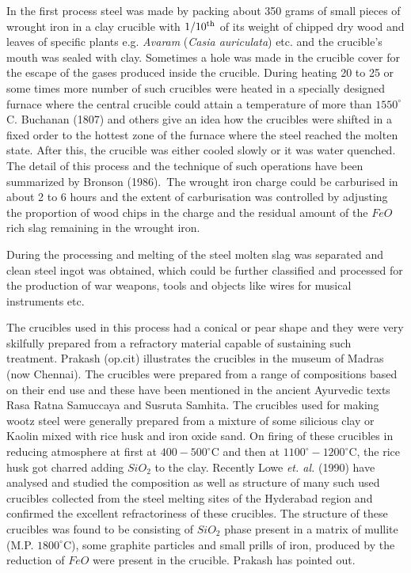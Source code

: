 In the first process steel was made by packing about 350 grams of small pieces of wrought iron in a clay crucible with $1/10^{\rm th}$ of its weight of chipped dry wood and leaves of specific plants e.g. {\it Avaram} ({\it Casia auriculata}) etc. and the crucible's mouth was sealed with clay. Sometimes a hole was made in the crucible cover for the escape of the gases produced inside the crucible. During heating 20 to 25 or some times more number of such crucibles were heated in a specially designed furnace where the central crucible could attain a temperature of more than $1550^\circ$C. Buchanan (1807) and others give an idea how the crucibles were shifted in a fixed order to the hottest zone of the furnace where the steel reached the molten state. After this, the crucible was either cooled slowly or it was water quenched. The detail of this process and the technique of such operations have been summarized by Bronson (1986).~The wrought iron charge could be carburised in about 2 to 6 hours and the extent of carburisation was controlled by adjusting the proportion of wood chips in the charge and the residual amount of the $FeO$ rich slag remaining in the wrought iron.

During the processing and melting of the steel molten slag was separated and clean steel ingot was obtained, which could be further classified and processed for the production of war weapons, tools and objects like wires for musical instruments etc. 

The crucibles used in this process had a conical or pear shape and they were very skilfully prepared from a refractory material capable of sustaining such treatment. Prakash (op.cit) illustrates the crucibles in the museum of Madras (now Chennai). The crucibles were prepared from a range of compositions based on their end use and these have been mentioned in the ancient Ayurvedic texts Rasa Ratna Samuccaya and Susruta Samhita. The crucibles used for making wootz steel were generally prepared from a mixture of some silicious clay or Kaolin mixed with rice husk and iron oxide sand. On firing of these crucibles in reducing atmosphere at first at $400-500^\circ$C and then at $1100^\circ-1200^\circ$C, the rice husk got charred adding $SiO_2$ to the clay. Recently Lowe {\it et. al.} (1990) have analysed and studied the composition as well as structure of many such used crucibles collected from the steel melting sites of the Hyderabad region and confirmed the excellent refractoriness of these crucibles. The structure of these crucibles was found to be consisting of $SiO_2$ phase present in a matrix of mullite (M.P. $1800^\circ$C), some graphite particles and small prills of iron, produced by the reduction of $FeO$ were present in the crucible. Prakash has pointed out.

